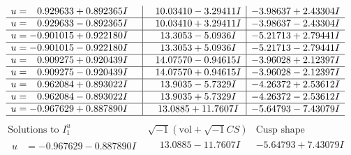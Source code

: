 \documentclass[1p]{elsarticle_modified}
\theoremstyle{definition}
\newcommand{\I}{\sqrt{-1}}
\begin{document}
$$\begin{array}{c|c|c}
\begin{aligned}
u &= \phantom{-}0.929633 + 0.892365 I\end{aligned}
 & \phantom{-}10.03410 - 3.29411 I & -3.98637 + 2.43304 I \\ \hline\begin{aligned}
u &= \phantom{-}0.929633 - 0.892365 I\end{aligned}
 & \phantom{-}10.03410 + 3.29411 I & -3.98637 - 2.43304 I \\ \hline\begin{aligned}
u &= -0.901015 + 0.922180 I\end{aligned}
 & \phantom{-}13.3053 - 5.0936 I & -5.21713 + 2.79441 I \\ \hline\begin{aligned}
u &= -0.901015 - 0.922180 I\end{aligned}
 & \phantom{-}13.3053 + 5.0936 I & -5.21713 - 2.79441 I \\ \hline\begin{aligned}
u &= \phantom{-}0.909275 + 0.920439 I\end{aligned}
 & \phantom{-}14.07570 - 0.94615 I & -3.96028 + 2.12397 I \\ \hline\begin{aligned}
u &= \phantom{-}0.909275 - 0.920439 I\end{aligned}
 & \phantom{-}14.07570 + 0.94615 I & -3.96028 - 2.12397 I \\ \hline\begin{aligned}
u &= \phantom{-}0.962084 + 0.893022 I\end{aligned}
 & \phantom{-}13.9035 - 5.7329 I & -4.26372 + 2.53612 I \\ \hline\begin{aligned}
u &= \phantom{-}0.962084 - 0.893022 I\end{aligned}
 & \phantom{-}13.9035 + 5.7329 I & -4.26372 - 2.53612 I \\ \hline\begin{aligned}
u &= -0.967629 + 0.887890 I\end{aligned}
 & \phantom{-}13.0885 + 11.7607 I & -5.64793 - 7.43079 I\\
 \hline 
 \end{array}$$\newpage$$\begin{array}{c|c|c}  
\text{Solutions to }I^u_{1}& \I (\text{vol} + \sqrt{-1}CS) & \text{Cusp shape}\\
 \hline 
\begin{aligned}
u &= -0.967629 - 0.887890 I\end{aligned}
 & \phantom{-}13.0885 - 11.7607 I & -5.64793 + 7.43079 I \\ \hline\begin{aligned}

\end{aligned}
\end{array}$$
\end{document}
